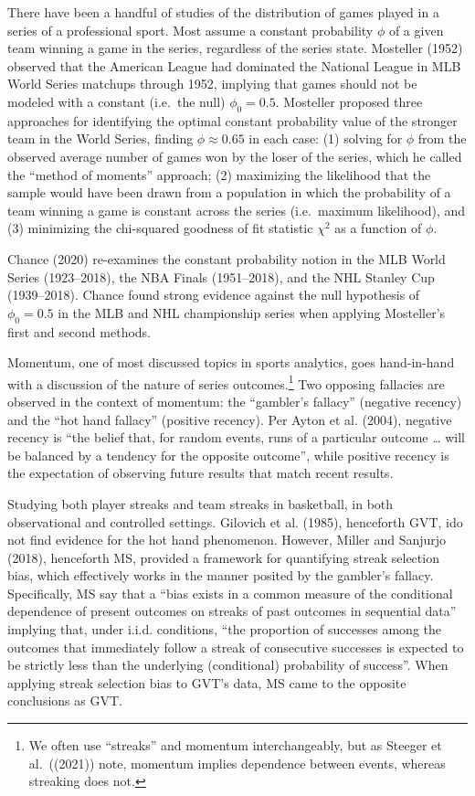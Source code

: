 \documentclass{article}
\begin{document}
There have been a handful of studies of the distribution of games played
in a series of a professional sport. Most assume a constant probability
\(\phi\) of a given team winning a game in the series, regardless of the
series state. Mosteller (1952) observed that the American League had
dominated the National League in MLB World Series matchups through 1952,
implying that games should not be modeled with a constant (i.e.~the
null) \(\phi_0 = 0.5\). Mosteller proposed three approaches for
identifying the optimal constant probability value of the stronger team
in the World Series, finding \(\phi \approx 0.65\) in each case: (1)
solving for \(\phi\) from the observed average number of games won by
the loser of the series, which he called the ``method of moments''
approach; (2) maximizing the likelihood that the sample would have been
drawn from a population in which the probability of a team winning a
game is constant across the series (i.e.~maximum likelihood), and (3)
minimizing the chi-squared goodness of fit statistic \(\chi^2\) as a
function of \(\phi\).

Chance (2020) re-examines the constant probability notion in the MLB
World Series (1923--2018), the NBA Finals (1951--2018), and the NHL
Stanley Cup (1939--2018). Chance found strong evidence against the null
hypothesis of \(\phi_0 = 0.5\) in the MLB and NHL championship series
when applying Mosteller's first and second methods.

Momentum, one of most discussed topics in sports analytics, goes
hand-in-hand with a discussion of the nature of series
outcomes.\footnote{We often use ``streaks'' and momentum
  interchangeably, but as Steeger et al.~((2021)) note, momentum implies
  dependence between events, whereas streaking does not.} Two opposing
fallacies are observed in the context of momentum: the ``gambler's
fallacy'' (negative recency) and the ``hot hand fallacy'' (positive
recency). Per Ayton et al. (2004), negative recency is ``the belief
that, for random events, runs of a particular outcome \ldots{} will be
balanced by a tendency for the opposite outcome'', while positive
recency is the expectation of observing future results that match recent
results.

Studying both player streaks and team streaks in basketball, in both
observational and controlled settings. Gilovich et al. (1985),
henceforth GVT, ido not find evidence for the hot hand phenomenon.
However, Miller and Sanjurjo (2018), henceforth MS, provided a framework
for quantifying streak selection bias, which effectively works in the
manner posited by the gambler's fallacy. Specifically, MS say that a
``bias exists in a common measure of the conditional dependence of
present outcomes on streaks of past outcomes in sequential data''
implying that, under i.i.d. conditions, ``the proportion of successes
among the outcomes that immediately follow a streak of consecutive
successes is expected to be strictly less than the underlying
(conditional) probability of success''. When applying streak selection
bias to GVT's data, MS came to the opposite conclusions as GVT.
\end{document}
